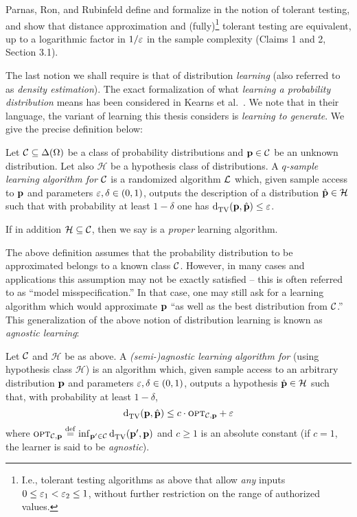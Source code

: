 \begin{remark}
Parnas, Ron, and Rubinfeld define and formalize in \cite{PRR:06} the notion of tolerant testing, and show that distance approximation and (fully)\footnote{I.e., tolerant testing algorithms as above that allow \emph{any} inputs $0 \leq \varepsilon_1 < \varepsilon_2 \leq 1$, without further restriction on the range of authorized values.} tolerant testing are equivalent, up to a logarithmic factor in $1/\varepsilon$ in the sample complexity (Claims 1 and 2, Section 3.1).
\end{remark}

The last notion we shall require is that of distribution \emph{learning} (also referred to as \emph{density estimation}). The exact formalization of what \emph{learning a probability distribution} means has been considered in Kearns et al.~\cite{Kearns:94}. We note that in their language, the variant of learning this thesis considers is \emph{learning to generate}. We give the precise definition below:  
\begin{definition}
Let $\mathcal{C}\subseteq\Delta\!\left({\Omega}\right)$ be a class of probability distributions and $\mathbf{p}\in \mathcal{C}$ be an unknown distribution. Let also $\mathcal{H}$ be a hypothesis class of distributions. 
A \emph{$q$-sample learning algorithm for $\mathcal{C}$} is a randomized algorithm $\mathcal{L}$ which, given sample access to $\mathbf{p}$ and parameters $\varepsilon,\delta\in(0,1)$,  outputs the description of a distribution $\hat{\mathbf{p}}\in \mathcal{H}$ such that with probability at least $1-\delta$ one has ${\operatorname{d}_{\textrm{TV}}^{}\!\left({\mathbf{p}, \hat{\mathbf{p}}}\right)}\leq \varepsilon$. 

\noindent If in addition $\mathcal{H}\subseteq \mathcal{C}$, then we say \Learner is a \emph{proper} learning algorithm.   
\end{definition}
The above definition assumes that the probability distribution to be approximated belongs to a known class $\mathcal{C}$. However, in many cases and applications this assumption may not be exactly satisfied -- this is often referred to as ``model misspecification.'' In that case, one may still ask for a learning algorithm which would approximate $\mathbf{p}$ ``as well as the best distribution from $\mathcal{C}$.'' This generalization of the above notion of distribution learning is known as \emph{agnostic learning}:
\begin{definition}
Let $\mathcal{C}$  and $\mathcal{H}$ be as above. A \emph{(semi-)agnostic learning algorithm for \class} (using hypothesis class $\mathcal{H}$) is an algorithm \Algo which, given sample access to an arbitrary distribution $\mathbf{p}$ and parameters $\varepsilon,\delta\in(0,1)$, outputs a hypothesis $\hat{\mathbf{p}}\in\mathcal{H}$ such that,  with probability at least $1-\delta$,
\[
	{\operatorname{d}_{\textrm{TV}}^{}\!\left({\mathbf{p}, \hat{\mathbf{p}}}\right)} \leq c\cdot{\textsc{opt}}_{\mathcal{C},\mathbf{p}} + \varepsilon
\]
where ${\textsc{opt}}_{\mathcal{C},\mathbf{p}}\stackrel{\rm def}{=} \inf_{\mathbf{p}'\in\mathcal{C}} {\operatorname{d}_{\textrm{TV}}^{}\!\left({\mathbf{p}', \mathbf{p}}\right)}$ and $c\geq 1$ is an absolute constant (if $c=1$, the learner is said to be \emph{agnostic}).
\end{definition}

